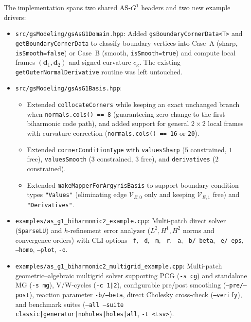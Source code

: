 \documentclass[11pt,a4paper]{article}
\begin{document}
The implementation spans two shared AS-$G^1$ headers and two new example drivers:
\begin{itemize}
    \item \texttt{src/gsModeling/gsAsG1Domain.hpp}: Added \texttt{gsBoundaryCornerData<T>} and \texttt{getBoundaryCornerData} to classify boundary vertices into Case~A (sharp, \texttt{isSmooth=false}) or Case~B (smooth, \texttt{isSmooth=true}) and compute local frames $(\mathbf{d}_1, \mathbf{d}_2)$ and signed curvature $c_\kappa$. The existing \texttt{getOuterNormalDerivative} routine was left untouched.
    \item \texttt{src/gsModeling/gsAsG1Basis.hpp}:
    \begin{itemize}
        \item Extended \texttt{collocateCorners} while keeping an exact unchanged branch when \texttt{normals.cols() == 8} (guaranteeing zero change to the first biharmonic code path), and added support for general $2\times 2$ local frames with curvature correction (\texttt{normals.cols() == 16} or \texttt{20}).
        \item Extended \texttt{cornerConditionType} with \texttt{valuesSharp} ($5$ constrained, $1$ free), \texttt{valuesSmooth} ($3$ constrained, $3$ free), and \texttt{derivatives} ($2$ constrained).
        \item Extended \texttt{makeMapperForArgyrisBasis} to support boundary condition types \texttt{"Values"} (eliminating edge $\mathcal{V}_{E,0}$ only and keeping $\mathcal{V}_{E,1}$ free) and \texttt{"Derivatives"}.
    \end{itemize}
    \item \texttt{examples/as\_g1\_biharmonic2\_example.cpp}: Multi-patch direct solver (\texttt{SparseLU}) and $h$-refinement error analyzer ($L^2, H^1, H^2$ norms and convergence orders) with CLI options \texttt{-f}, \texttt{-d}, \texttt{-m}, \texttt{-r}, \texttt{-a}, \texttt{-b/--beta}, \texttt{-e/--eps}, \texttt{--homo}, \texttt{--plot}, \texttt{-o}.
    \item \texttt{examples/as\_g1\_biharmonic2\_multigrid\_example.cpp}: Multi-patch geometric--algebraic multigrid solver supporting PCG (\texttt{-s cg}) and standalone MG (\texttt{-s mg}), V/W-cycles (\texttt{-c 1|2}), configurable pre/post smoothing (\texttt{--pre/--post}), reaction parameter \texttt{-b/--beta}, direct Cholesky cross-check (\texttt{--verify}), and benchmark suites (\texttt{--all --suite classic|generator|noholes|holes|all}, \texttt{-t <tsv>}).
\end{itemize}
\end{document}
